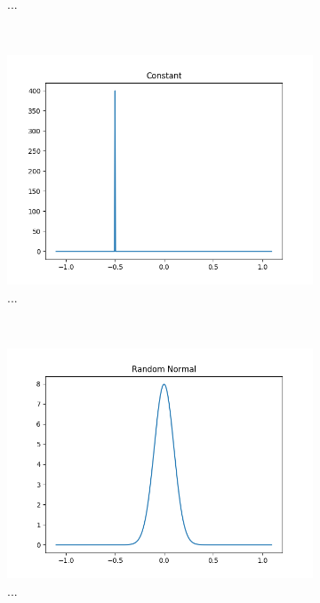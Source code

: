 \begin{figure}[h!]
\begin{subfigure}[t]{0.5\textwidth}
		\caption{...}
	\end{subfigure}
	~
	\begin{subfigure}[t]{0.5\textwidth}
		\centering
		\includegraphics[width=\textwidth]{img/methodology_neuralNetwork_initializerFunctions_constant.png}
		\caption{...}
	\end{subfigure}%
	~ 
	\begin{subfigure}[t]{0.5\textwidth}
		\centering
		\includegraphics[width=\textwidth]{img/methodology_neuralNetwork_initializerFunctions_randomNormal.png}
		\caption{...}
	\end{subfigure}
	~ 
	\begin{subfigure}[t]{0.5\textwidth}
		\centering

\end{subfigure}
\end{figure}
